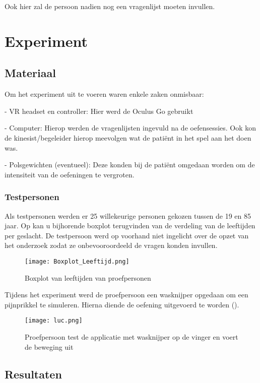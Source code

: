 Ook hier zal de persoon nadien nog een vragenlijst moeten invullen.

\chapter{Experiment}

\section{Materiaal}
Om het experiment uit te voeren waren enkele zaken onmisbaar:

- VR headset en controller: Hier werd de Oculus Go gebruikt

- Computer: Hierop werden de vragenlijsten ingevuld na de oefensessies. Ook kon de kinesist/begeleider hierop meevolgen wat de patiënt in het spel aan het doen was.

- Polsgewichten (eventueel): Deze konden bij de patiënt omgedaan worden om de intensiteit van de oefeningen te vergroten.

\newpage
\subsection{Testpersonen}
Als testpersonen werden er 25 willekeurige personen gekozen tussen de 19 en 85 jaar. Op \cite{figuur 6.1} kan u bijhorende boxplot terugvinden van de verdeling van de leeftijden per geslacht. De testpersoon werd op voorhand niet ingelicht over de opzet van het onderzoek zodat ze onbevooroordeeld de vragen konden invullen.

\begin{figure}[h]
    \centering
    \texttt{[image: Boxplot\_Leeftijd.png]}
    \caption{Boxplot van leeftijden van proefpersonen}
\end{figure}

Tijdens het experiment werd de proefpersoon een wasknijper opgedaan om een pijnprikkel te simuleren. Hierna diende de oefening uitgevoerd te worden (\cite{figuur 6.2}).

\begin{figure}[h]
    \centering
    \texttt{[image: luc.png]}
    \caption{Proefpersoon test de applicatie met wasknijper op de vinger en voert de beweging uit}
\end{figure}

\newpage

\section{Resultaten}

